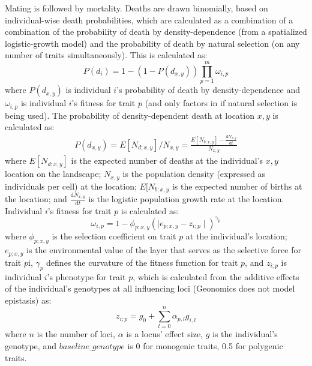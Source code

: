 ﻿\documentclass{article}
\begin{document}
Mating is followed by mortality. Deaths are drawn binomially, based on 
individual-wise death probabilities, which are calculated as a combination of
a combination of the probability of death by density-dependence (from a spatialized logistic-growth model)
and the probability of death by natural selection (on any number of traits simultaneously). 
This is calculated as:
\begin{equation}
P(d_{i}) = 1 - (1 - P(d_{x,y})) \prod_{p = 1}^{m}\omega_{i,p}
\end{equation}
where $P(d_{x,y})$ is individual $i$'s probability of death by density-dependence
and $\omega_{i,p}$ is individual $i$'s fitness for trait $p$
(and only factors in if natural selection is being used).
The probability of density-dependent death at location $x,y$ is calculated as:
\begin{equation}
\begin{split}
       P(d_{x,y}) = E[N_{d;x,y}]/N_{x,y} = \frac{E[N_{b;x,y}] - \frac{\mathrm{d}N_{x,y}}{\mathrm{d}t}}{N_{x,y}}
\end{split}
\end{equation}
where $E[N_{d;x,y}]$ is the expected number of deaths at the individual's $x,y$ location on the landscape;
$N_{x,y}$ is the population density (expressed as individuals per cell) at the location;
$E[N_{b;x,y}$ is the expected number of births at the location;
and $\frac{\mathrm{d}N_{x,y}}{\mathrm{d}t}$ is the logistic population growth rate at the location.
Individual $i$'s fitness for trait $p$ is calculated as:
\begin{equation}
\omega_{i,p}= 1 - \phi_{p;x,y} {( \mid e_{p;x,y} - z_{i;p} \mid )}^{\gamma_{p}}
\end{equation}
where $\phi_{p;x,y}$ is the selection coefficient on trait $p$ at the
individual's location; $e_{p;x,y}$ is the environmental value
of the layer that serves as the selective force for trait $p$i,
$\gamma_{p}$ defines the curvature of the fitness function for trait $p$,
and $z_{i;p}$ is individual $i$'s phenotype for trait $p$, which is calculated
from the additive effects of the individual's genotypes at all influencing loci
(Geonomics does not model epistasis) as:
\begin{equation}
        z_{i;p} = g_{0} + \sum_{l = 0}^{n} \alpha_{p,l} g_{i,l}
\end{equation}
where $n$ is the number of loci, $\alpha$ is a locus' effect size, $g$ is the
individual's genotype, and $baseline\_genotype$ is 0 for monogenic traits,
0.5 for polygenic traits. 
\end{document}
